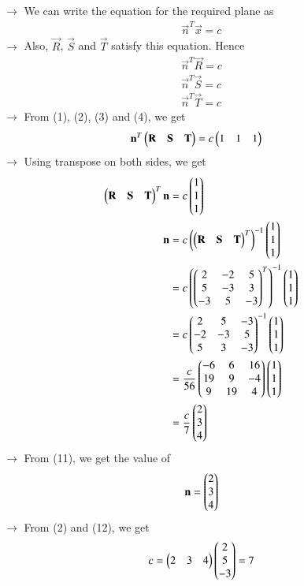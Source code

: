 \documentclass[journal]{IEEEtran}
\begin{document}
$\rightarrow$ We can write the equation for the required plane as
\begin{align} \vec{n}^{T}\vec{x} = c \end{align}
$\rightarrow$ Also, $\vec{R}$, $\vec{S}$ and $\vec{T}$ satisfy this equation. Hence
\begin{align}
    \vec{n}^{T}\vec{R} = c \\
    \vec{n}^{T}\vec{S} = c \\
    \vec{n}^{T}\vec{T} = c
\end{align}
$\rightarrow$ From (1), (2), (3) and (4), we get
\begin{align} \mathbf{n}^{T}\begin{pmatrix}\mathbf{R} & \mathbf{S} & \mathbf{T}\end{pmatrix} &= c\begin{pmatrix}1 & 1 & 1\end{pmatrix} \end{align}
$\rightarrow$ Using transpose on both sides, we get
\begin{align}
    \begin{pmatrix}\mathbf{R} & \mathbf{S} & \mathbf{T}\end{pmatrix}^{T} \mathbf{n} &= c\begin{pmatrix}1\\1\\1\end{pmatrix} \\
    \mathbf{n} &= c \left(\begin{pmatrix}\mathbf{R} & \mathbf{S} & \mathbf{T}\end{pmatrix}^{T}\right)^{-1} \begin{pmatrix}1\\1\\1\end{pmatrix} \\
    &= c \left(\begin{pmatrix}2 & -2 & 5 \\ 5 & -3 & 3 \\ -3 & 5 & -3\end{pmatrix}^{T}\right)^{-1} \begin{pmatrix}1\\1\\1\end{pmatrix} \\
    &= c \begin{pmatrix}2 & 5 & -3 \\ -2 & -3 & 5 \\ 5 & 3 & -3\end{pmatrix}^{-1} \begin{pmatrix}1\\1\\1\end{pmatrix} \\
    &= \frac{c}{56} \begin{pmatrix}-6 & 6 & 16 \\ 19 & 9 & -4 \\ 9 & 19 & 4\end{pmatrix} \begin{pmatrix}1\\1\\1\end{pmatrix} \\
    &= \frac{c}{7} \begin{pmatrix}2\\3\\4\end{pmatrix}
\end{align}
$\rightarrow$ From (11), we get the value of
\begin{align} \mathbf{n} = \begin{pmatrix}2 \\ 3 \\ 4\end{pmatrix} \end{align}
$\rightarrow$ From (2) and (12), we get
\begin{align} c = \begin{pmatrix}2 & 3 & 4\end{pmatrix} \begin{pmatrix}2 \\ 5 \\ -3\end{pmatrix} = 7 \end{align}
\end{document}
